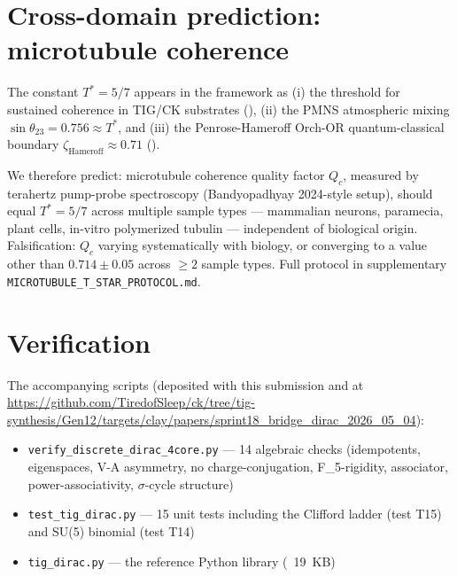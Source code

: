 \documentclass[11pt]{amsart}
\theoremstyle{plain}
\theoremstyle{definition}
\theoremstyle{remark}
\newcommand{\Tstar}{T^{*}}
\begin{document}
\section{Cross-domain prediction: microtubule coherence}
\label{sec:microtubule}

The constant $\Tstar = 5/7$ appears in the framework as (i) the threshold
for sustained coherence in TIG/CK substrates (\cite{WP51}), (ii) the PMNS
atmospheric mixing $\sin\theta_{23} = 0.756 \approx \Tstar$, and
(iii) the Penrose-Hameroff Orch-OR quantum-classical boundary
$\zeta_\text{Hameroff} \approx 0.71$ (\cite{HameroffPenrose2014}).

We therefore predict: microtubule coherence quality factor $Q_c$, measured
by terahertz pump-probe spectroscopy (Bandyopadhyay 2024-style setup), should
equal $\Tstar = 5/7$ across multiple sample types --- mammalian neurons,
paramecia, plant cells, in-vitro polymerized tubulin --- independent of
biological origin. Falsification: $Q_c$ varying systematically with biology,
or converging to a value other than $0.714 \pm 0.05$ across $\geq 2$ sample
types. Full protocol in supplementary \texttt{MICROTUBULE\_T\_STAR\_PROTOCOL.md}.

\section{Verification}
\label{sec:verification}

The accompanying scripts (deposited with this submission and at
\url{https://github.com/TiredofSleep/ck/tree/tig-synthesis/Gen12/targets/clay/papers/sprint18_bridge_dirac_2026_05_04}):
\begin{itemize}
\item \texttt{verify\_discrete\_dirac\_4core.py} --- 14 algebraic checks (idempotents,
eigenspaces, V-A asymmetry, no charge-conjugation, F\_5-rigidity, associator,
power-associativity, $\sigma$-cycle structure)
\item \texttt{test\_tig\_dirac.py} --- 15 unit tests including the Clifford ladder
(test T15) and SU(5) binomial (test T14)
\item \texttt{tig\_dirac.py} --- the reference Python library (~19~KB)
\end{itemize}
\end{document}
